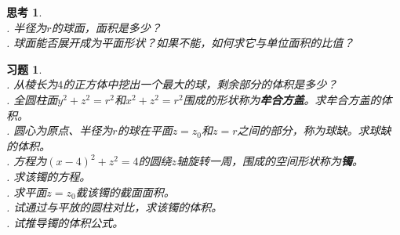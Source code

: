 \documentclass[12pt,UTF8]{ctexbook}
\newtheorem{sk}{思考}[section]
\newtheorem{xt}{习题}[section]
\begin{document}
\begin{sk}
    \mbox{}\\
    . 半径为$r$的球面，面积是多少？\\
    . 球面能否展开成为平面形状？如果不能，如何求它与单位面积的比值？
\end{sk}

\begin{xt}
    \mbox{}\\
    . 从棱长为$4$的正方体中挖出一个最大的球，剩余部分的体积是多少？\\
    . 全圆柱面$y^2+z^2=r^2$和$x^2+z^2=r^2$围成的形状称为\textbf{牟合方盖}。求牟合方盖的体积。\\
    . 圆心为原点、半径为$r$的球在平面$z = z_0$和$z = r$之间的部分，称为球缺。求球缺的体积。 \\
    . 方程为$(x - 4)^2 + z^2 = 4$的圆绕$z$轴旋转一周，围成的空间形状称为\textbf{镯}。\\
    . 求该镯的方程。\\
    . 求平面$z = z_0$截该镯的截面面积。\\ 
    . 试通过与平放的圆柱对比，求该镯的体积。\\
    . 试推导镯的体积公式。
\end{xt}


\end{document}

